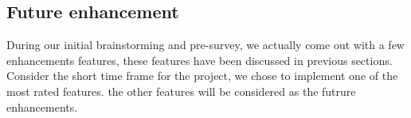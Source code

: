 

\subsection{Future enhancement}
During our initial brainstorming and pre-survey, we actually come out with a 
few enhancements features, these features have been discussed in previous 
sections. Consider the short time frame for the project, we chose to implement 
one of the most rated features. the other features will be considered as the 
futrure enhancements.